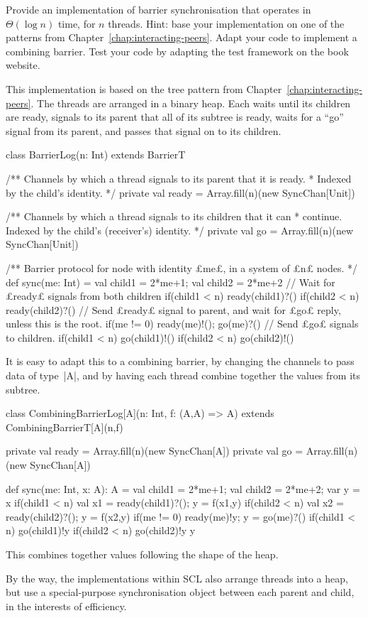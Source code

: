 \begin{questionS}
\label{ex:barrierLog}
Provide an implementation of barrier synchronisation that operates in
$\Theta(\log n)$ time, for $n$ threads.  Hint: base your implementation on one
of the patterns from Chapter~\ref{chap:interacting-peers}.  Adapt your code to
implement a combining barrier.  Test your code by adapting the test framework
on the book website.
\end{questionS}


\begin{answerS}
This implementation is based on the tree pattern from
Chapter~\ref{chap:interacting-peers}.
%
The threads are arranged in a binary heap.  Each waits until its children
are ready, signals to its parent that all of its subtree is ready, waits for a
``go'' signal from its parent, and passes that signal on to its children.
%
\begin{scala}
class BarrierLog(n: Int) extends BarrierT{
  /** Channels by which a thread signals to its parent that it is ready.
    * Indexed by the child's identity. */ 
  private val ready = Array.fill(n)(new SyncChan[Unit])

  /** Channels by which a thread signals to its children that it can
    * continue.  Indexed by the child's (receiver's) identity. */ 
  private val go = Array.fill(n)(new SyncChan[Unit])

  /** Barrier protocol for node with identity £me£, in a system of £n£ nodes. */
  def sync(me: Int) = {
    val child1 = 2*me+1; val child2 = 2*me+2
    // Wait for £ready£ signals from both children
    if(child1 < n) ready(child1)?()
    if(child2 < n) ready(child2)?()
    // Send £ready£ signal to parent, and wait for £go£ reply, unless this is the root.
    if(me != 0){ ready(me)!(); go(me)?() }
    // Send £go£ signals to children.
    if(child1 < n) go(child1)!()
    if(child2 < n) go(child2)!()
  }
}
\end{scala}

It is easy to adapt this to a combining barrier, by changing the channels to
pass data of type~|A|, and by having each thread combine together the values
from its subtree.
%
\begin{scala}
class CombiningBarrierLog[A](n: Int, f: (A,A) => A) 
    extends CombiningBarrierT[A](n,f){
  private val ready = Array.fill(n)(new SyncChan[A])
  private val go = Array.fill(n)(new SyncChan[A])

  def sync(me: Int, x: A): A = {
    val child1 = 2*me+1; val child2 = 2*me+2; var y = x
    if(child1 < n){ val x1 = ready(child1)?(); y = f(x1,y) }
    if(child2 < n){ val x2 = ready(child2)?(); y = f(x2,y) }
    if(me != 0){ ready(me)!y; y = go(me)?() }
    if(child1 < n) go(child1)!y
    if(child2 < n) go(child2)!y
    y
  }
}
\end{scala}
%
This combines together values following the shape of the heap.

By the way, the implementations within SCL also arrange threads into a heap,
but use a special-purpose synchronisation object between each parent and
child, in the interests of efficiency.
\end{answerS}
